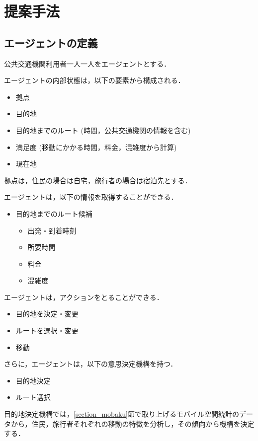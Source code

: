 \section{提案手法}
\label{section_method}
\subsection{エージェントの定義}
\label{section_agent}
公共交通機関利用者一人一人をエージェントとする．

エージェントの内部状態は，以下の要素から構成される．
\begin{itemize}
  \item 拠点
  \item 目的地
  \item 目的地までのルート (時間，公共交通機関の情報を含む)
  \item 満足度 (移動にかかる時間，料金，混雑度から計算)
  \item 現在地
\end{itemize}

拠点は，住民の場合は自宅，旅行者の場合は宿泊先とする．

エージェントは，以下の情報を取得することができる．
\begin{itemize}
  \item 目的地までのルート候補
    \begin{itemize}
      \item 出発・到着時刻
      \item 所要時間
      \item 料金
      \item 混雑度
    \end{itemize}
\end{itemize}

エージェントは，アクションをとることができる．
\begin{itemize}
  \item 目的地を決定・変更
  \item ルートを選択・変更
  \item 移動
\end{itemize}

さらに，エージェントは，以下の意思決定機構を持つ．
\begin{itemize}
  \item 目的地決定
  \item ルート選択
\end{itemize}

目的地決定機構では，\ref{section_mobaku}節で取り上げるモバイル空間統計のデータから，住民，旅行者それぞれの移動の特徴を分析し，その傾向から機構を決定する．

